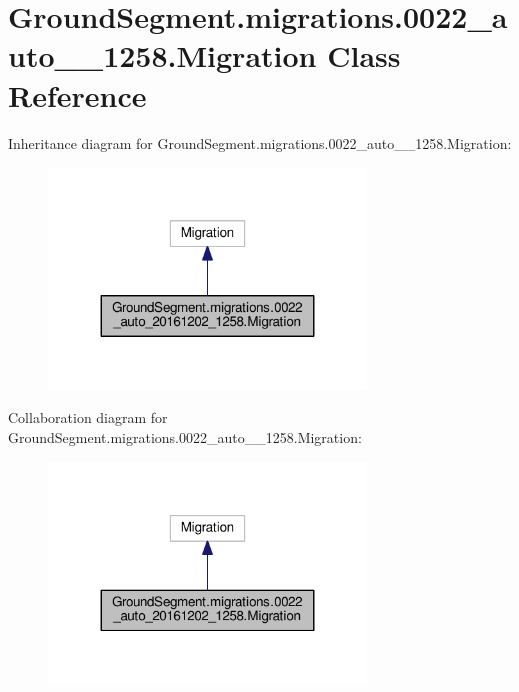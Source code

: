 \hypertarget{class_ground_segment_1_1migrations_1_10022__auto__20161202__1258_1_1_migration}{}\section{Ground\+Segment.\+migrations.0022\+\_\+auto\+\_\+\_\+1258.Migration Class Reference}
\label{class_ground_segment_1_1migrations_1_10022__auto__20161202__1258_1_1_migration}


Inheritance diagram for Ground\+Segment.\+migrations.0022\+\_\+auto\+\_\+\_\+1258.Migration\+:\nopagebreak
\begin{figure}[H]
\begin{center}
\leavevmode
\includegraphics[width=239pt]{class_ground_segment_1_1migrations_1_10022__auto__20161202__1258_1_1_migration__inherit__graph}
\end{center}
\end{figure}


Collaboration diagram for Ground\+Segment.\+migrations.0022\+\_\+auto\+\_\+\_\+1258.Migration\+:\nopagebreak
\begin{figure}[H]
\begin{center}
\leavevmode
\includegraphics[width=239pt]{class_ground_segment_1_1migrations_1_10022__auto__20161202__1258_1_1_migration__coll__graph}
\end{center}
\end{figure}
